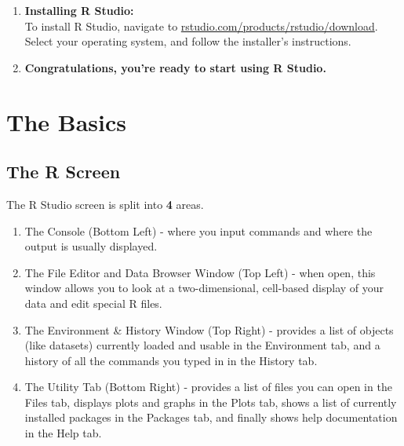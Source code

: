 \documentclass[12pt,letterpaper]{article}
\begin{document}
\begin{enumerate}
	\item \textbf{Installing R Studio:}\\ \vspace{1em}
		To install R Studio, navigate to \href{https://rstudio.com/products/rstudio/download/#download}{rstudio.com/products/rstudio/download}. Select your operating system, and follow the installer's instructions. 
	\item \textbf{Congratulations, you're ready to start using R Studio.}
\end{enumerate}



\newpage
{}




\section{The Basics}

\subsection{The R Screen}
\normalsize The R Studio screen is split into \textbf{4} areas.
\begin{enumerate}
\item The Console (Bottom Left) - where you input commands and where the output is usually displayed.
\item The File Editor and Data Browser Window (Top Left) - when open, this window allows you to look at a two-dimensional, cell-based display of your data and edit special R files.
\item The Environment \& History Window (Top Right) - provides a list of objects (like datasets) currently loaded and usable in the Environment tab, and a history of all the commands you typed in in the History tab.
\item The Utility Tab (Bottom Right) - provides a list of files you can open in the Files tab, displays plots and graphs in the Plots tab, shows a list of currently installed packages in the Packages tab, and finally shows help documentation in the Help tab.
\end{enumerate}
\end{document}
